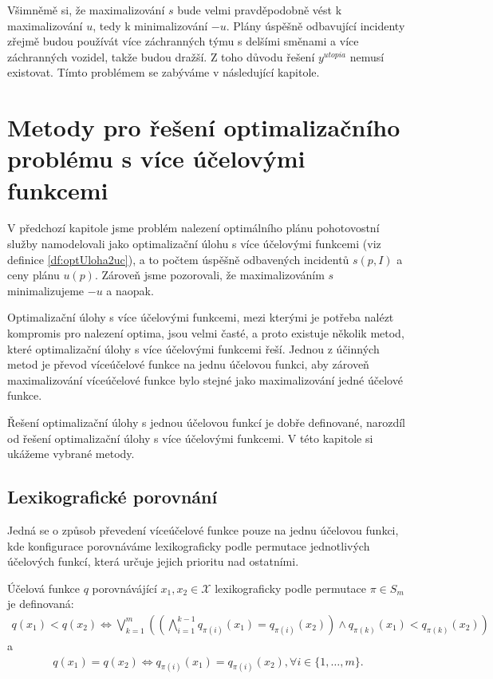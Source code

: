 Všimněmě si, že maximalizování $s$ bude velmi pravděpodobně vést k maximalizování $u$, tedy k minimalizování $-u$.
Plány úspěšně odbavující incidenty zřejmě budou používát více záchranných týmu s delšími směnami a více záchranných vozidel, takže budou dražší.
Z toho důvodu řešení $y^{utopia}$ nemusí existovat. Tímto problémem se zabýváme v následující kapitole.

\section{Metody pro řešení optimalizačního problému s více účelovými funkcemi}\label{kap:metodyProReseniOptSViceUcel}

V předchozí kapitole jsme problém nalezení optimálního plánu pohotovostní služby namodelovali jako optimalizační úlohu s více účelovými funkcemi (viz definice \ref{df:optUloha2uc}),
a to počtem úspěšně odbavených incidentů $s(p, I)$ a ceny plánu $u(p)$.
Zároveň jsme pozorovali, že maximalizováním $s$ minimalizujeme $-u$ a naopak.

Optimalizační úlohy s více účelovými funkcemi, mezi kterými je potřeba nalézt kompromis pro nalezení optima, jsou velmi časté,
a proto existuje několik metod, které optimalizační úlohy s více účelovými funkcemi řeší.
Jednou z účinných metod je převod víceúčelové funkce na jednu účelovou funkci, aby
zároveň maximalizování víceúčelové funkce bylo stejné jako maximalizování jedné účelové funkce.

Řešení optimalizační úlohy s jednou účelovou funkcí je dobře definované,
narozdíl od řešení optimalizační úlohy s více účelovými funkcemi.
V této kapitole si ukážeme vybrané metody.

\subsection{Lexikografické porovnání}

Jedná se o způsob převedení víceúčelové funkce pouze na jednu účelovou funkci, kde konfigurace porovnáváme lexikograficky podle permutace jednotlivých účelových funkcí,
která určuje jejich prioritu nad ostatními.

\begin{definice}\label{df:lexPorovnani}
  Účelová funkce $q$ porovnávájící $x_1, x_2 \in \mathcal{X}$ lexikograficky podle permutace $\pi \in S_m$ je definovaná:
  \begin{align*}
    q(x_1) < q(x_2) \Leftrightarrow \bigvee_{k=1}^m \left ( \left ( \bigwedge_{i=1}^{k-1} q_{\pi(i)}(x_1) = q_{\pi(i)}(x_2) \right ) \land q_{\pi(k)}(x_1) < q_{\pi(k)}(x_2) \right )
  \end{align*}
  a 
  \begin{align*}
    q(x_1) = q(x_2) \Leftrightarrow q_{\pi(i)}(x_1) = q_{\pi(i)}(x_2), \forall i \in \{ 1, \dots, m \}.
  \end{align*}
\end{definice}

